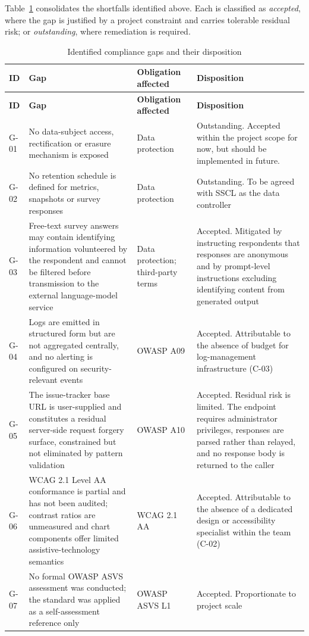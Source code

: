 Table~\ref{tab:compliance-gaps} consolidates the shortfalls identified above.
Each is classified as \emph{accepted}, where the gap is justified by a project
constraint and carries tolerable residual risk; or \emph{outstanding}, where
remediation is required.

\begin{longtable}{
  >{\raggedright\arraybackslash}p{}
  >{\raggedright\arraybackslash}p{}
  >{\raggedright\arraybackslash}p{}
  >{\raggedright\arraybackslash}p{}
}
\caption{Identified compliance gaps and their disposition}
\label{tab:compliance-gaps}\\
\toprule
\textbf{ID} & \textbf{Gap} & \textbf{Obligation affected} & \textbf{Disposition} \\
\midrule
\endfirsthead
\toprule
\textbf{ID} & \textbf{Gap} & \textbf{Obligation affected} & \textbf{Disposition} \\
\midrule
\endhead
\bottomrule
\endlastfoot
G-01 & No data-subject access, rectification or erasure mechanism is exposed & Data
protection & Outstanding. Accepted within the project scope for now, but should be  implemented in future.\\
\addlinespace
G-02 & No retention schedule is defined for metrics, snapshots or survey responses &
Data protection & Outstanding. To be agreed with SSCL as the data controller \\
\addlinespace
G-03 & Free-text survey answers may contain identifying information volunteered by
the respondent and cannot be filtered before transmission to the external
language-model service & Data protection; third-party terms & Accepted. Mitigated by
instructing respondents that responses are anonymous and by prompt-level instructions
excluding identifying content from generated output \\
\addlinespace
G-04 & Logs are emitted in structured form but are not aggregated centrally, and no
alerting is configured on security-relevant events & OWASP A09 & Accepted.
Attributable to the absence of budget for log-management infrastructure (C-03) \\
\addlinespace
G-05 & The issue-tracker base URL is user-supplied and constitutes a residual
server-side request forgery surface, constrained but not eliminated by pattern
validation & OWASP A10 & Accepted. Residual risk is limited. The endpoint requires
administrator privileges, responses are parsed rather than relayed, and no response
body is returned to the caller \\
\addlinespace
G-06 & WCAG 2.1 Level AA conformance is partial and has not been audited; contrast
ratios are unmeasured and chart components offer limited assistive-technology
semantics & WCAG 2.1 AA & Accepted. Attributable to the absence of a dedicated design
or accessibility specialist within the team (C-02) \\
\addlinespace
G-07 & No formal OWASP ASVS assessment was conducted; the standard was applied as a self-assessment reference only & OWASP ASVS L1 & Accepted. Proportionate to project scale \\
\end{longtable}

